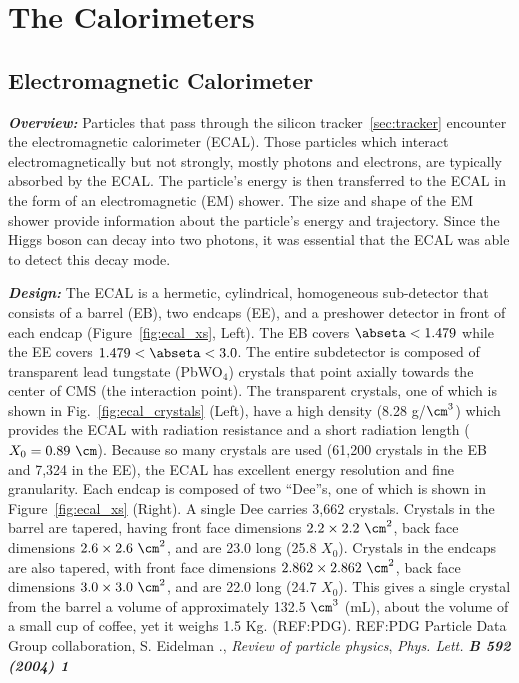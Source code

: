 \section{The Calorimeters}
\label{sec:calo}

\subsection{Electromagnetic Calorimeter}
\label{sec:ecal}

\textit{\textbf{Overview:}}
Particles that pass through the silicon tracker~\ref{sec:tracker} encounter the electromagnetic calorimeter (ECAL).
Those particles which interact electromagnetically but not strongly, mostly photons and electrons, are typically absorbed by the ECAL.
The particle's energy is then transferred to the ECAL in the form of an electromagnetic (EM) shower.
The size and shape of the EM shower provide information about the particle's energy and trajectory.
Since the Higgs boson can decay into two photons, it was essential that the ECAL was able to detect this decay mode.

\textit{\textbf{Design:}}
The ECAL is a hermetic, cylindrical, homogeneous sub-detector that consists of a barrel (EB), two endcaps (EE), and a preshower detector in front of each endcap (Figure~\ref{fig:ecal_xs}, Left).
The EB covers $\abseta < 1.479$ while the EE covers $1.479 < \abseta < 3.0$.
The entire subdetector is composed of transparent lead tungstate (PbWO$_4$) crystals that point axially towards the center of CMS (the interaction point).
The transparent crystals, one of which is shown in Fig.~\ref{fig:ecal_crystals} (Left), have a high density (8.28 g/$\cm^3$) which provides the ECAL with radiation resistance and a short radiation length ($X_0 = 0.89~\cm$).
Because so many crystals are used (61,200 crystals in the EB and 7,324 in the EE), the ECAL has excellent energy resolution and fine granularity.
Each endcap is composed of two ``Dee''s, one of which is shown in Figure~\ref{fig:ecal_xs} (Right).
A single Dee carries 3,662 crystals.
Crystals in the barrel are tapered, having front face dimensions $2.2 \times 2.2~\cm^2$, back face dimensions $2.6 \times 2.6~\cm^2$, and are 23.0 \cm long (25.8 $X_0$).
Crystals in the endcaps are also tapered, with front face dimensions $2.862 \times 2.862~\cm^2$, back face dimensions $3.0 \times 3.0~\cm^2$, and are 22.0 \cm long (24.7 $X_0$).
This gives a single crystal from the barrel a volume of approximately 132.5 $\cm^3$ (mL), about the volume of a small cup of coffee, yet it weighs 1.5 Kg.
(REF:PDG).
REF:PDG
Particle Data Group collaboration, S. Eidelman \etal., \textit{Review of particle physics},
\textit{Phys. Lett. \textbf{B 592 (2004) 1}}

